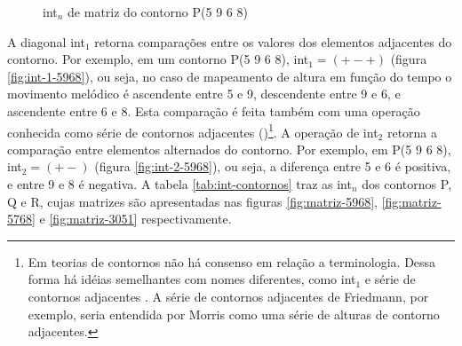 \begin{figure}
  \centering
  \qquad
  \qquad
  \caption{int$_n$ de matriz do contorno P(5 9 6 8)}
  \label{fig:int-exemplos}
\end{figure}

A diagonal int$_1$ retorna comparações entre os valores dos elementos
adjacentes do contorno. Por exemplo, em um contorno P(5 9 6 8),
int$_1=(+ - +)$ (figura \ref{fig:int-1-5968}), ou seja, no caso de
mapeamento de altura em função do tempo o movimento melódico é
ascendente entre 5 e 9, descendente entre 9 e 6, e ascendente entre 6
e 8. Esta comparação é feita também com uma operação conhecida como
série de contornos adjacentes ()\footnote{Em teorias de
  contornos não há consenso em relação a terminologia. Dessa forma há
  idéias semelhantes com nomes diferentes, como int$_1$ e série de
  contornos adjacentes \cite{friedmann87:response}. A série de
  contornos adjacentes de Friedmann, por exemplo, seria entendida por
  Morris como uma série de alturas de contorno adjacentes.}. A
operação de int$_2$ retorna a comparação entre elementos alternados do
contorno. Por exemplo, em P(5 9 6 8), int$_2=(+ -)$ (figura
\ref{fig:int-2-5968}), ou seja, a diferença entre 5 e 6 é positiva, e
entre 9 e 8 é negativa. A tabela \ref{tab:int-contornos} traz as
int$_n$ dos contornos P, Q e R, cujas matrizes são apresentadas nas
figuras \ref{fig:matriz-5968}, \ref{fig:matriz-5768} e
\ref{fig:matriz-3051} respectivamente.

